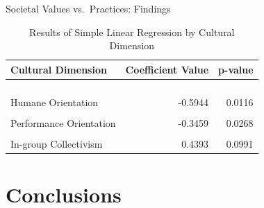 \documentclass[
  ignorenonframetext,
]{beamer}
\begin{document}
\begin{frame}{Societal Values vs.~Practices: Findings}
\protect\hypertarget{societal-values-vs.-practices-findings}{}
\begin{table}[!h]

\caption{\label{tab:SPV SLR Table}Results of Simple Linear Regression by Cultural Dimension}
\centering
\begin{tabular}[t]{lrr}
\toprule
Cultural Dimension & Coefficient Value & p-value\\
\midrule
\cellcolor[HTML]{E5F5E0}{Uncertainty Avoidance} & \cellcolor[HTML]{E5F5E0}{-0.6199} & \cellcolor[HTML]{E5F5E0}{0.0000}\\
\cellcolor[HTML]{E5F5E0}{Institutional Collectivism} & \cellcolor[HTML]{E5F5E0}{-0.5251} & \cellcolor[HTML]{E5F5E0}{0.0000}\\
\cellcolor[HTML]{E5F5E0}{Power Distance} & \cellcolor[HTML]{E5F5E0}{-0.4991} & \cellcolor[HTML]{E5F5E0}{0.0006}\\
\cellcolor[HTML]{E5F5E0}{Future Orientation} & \cellcolor[HTML]{E5F5E0}{-0.4725} & \cellcolor[HTML]{E5F5E0}{0.0009}\\
Humane Orientation & -0.5944 & 0.0116\\
\addlinespace
\cellcolor[HTML]{F0F0F0}{Gender Egalitarianism} & \cellcolor[HTML]{F0F0F0}{0.2437} & \cellcolor[HTML]{F0F0F0}{0.0124}\\
Performance Orientation & -0.3459 & 0.0268\\
\cellcolor[HTML]{F0F0F0}{Assertiveness} & \cellcolor[HTML]{F0F0F0}{-0.1507} & \cellcolor[HTML]{F0F0F0}{0.0414}\\
In-group Collectivism & 0.4393 & 0.0991\\
\bottomrule
\end{tabular}
\end{table}
\end{frame}

\hypertarget{conclusions}{%
\section{Conclusions}\label{conclusions}}
\end{document}
